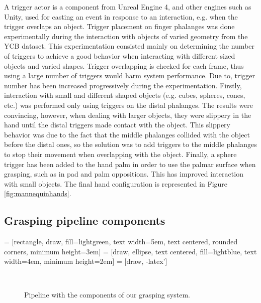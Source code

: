 A trigger actor is a component from Unreal Engine 4, and other engines such as Unity, used for casting an event in response to an interaction, e.g. when the trigger overlaps an object. Trigger placement on finger phalanges was done experimentally during the interaction with objects of varied geometry from the YCB dataset. This experimentation consisted mainly on determining the number of triggers to achieve a good behavior when interacting with different sized objects and varied shapes. Trigger overlapping is checked for each frame, thus using a large number of triggers would harm system performance. Due to, trigger number has been increased progressively during the experimentation. Firstly, interaction with small and different shaped objects (e.g. cubes, spheres, cones, etc.) was performed only using triggers on the distal phalanges. The results were convincing, however, when dealing with larger objects, they were slippery in the hand until the distal triggers made contact with the object. This slippery behavior was due to the fact that the middle phalanges collided with the object before the distal ones, so the solution was to add triggers to the middle phalanges to stop their movement when overlapping with the object. Finally, a sphere trigger has been added to the hand palm in order to use the palmar surface when grasping, such as in pad and palm oppositions. This has improved interaction with small objects. The final hand configuration is represented in Figure \ref{fig:mannequinhands}.

\subsection{Grasping pipeline components}



 = [rectangle, draw, fill=lightgreen, 
text width=5em, text centered, rounded corners, minimum height=3em]
 = [draw, ellipse, text centered, fill=lightblue, text width=4em,
minimum height=2em]
 = [draw, -latex']

\begin{figure}[!t]
	\centering
	$  $
	\caption{Pipeline with the components of our grasping system.}
	\label{fig:pipeline}
\end{figure}

